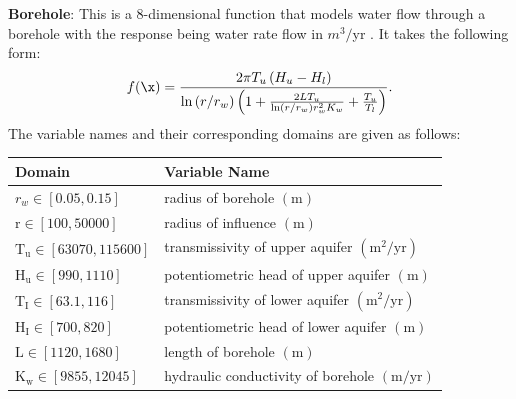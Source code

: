 \documentclass [PhD] {package/uclathes}
\begin{document}
\textbf{Borehole}: This is a 8-dimensional function that models water flow through a borehole with the response being water rate flow in $m^3/$yr  \parencite{simulationlib}. It takes the following form:
\begin{equation*}
f(\x)=\frac{2 \pi T_u\left(H_u-H_l\right)}{\ln \left(r / r_w\right)\left(1+\frac{2 L T_u}{\ln \left(r / r_w\right) r_w^2 K_w}+\frac{T_u}{T_l}\right)}.
\end{equation*}
The variable names and their corresponding domains are given as follows: \\

\begin{center}
\begin{tabular}{|l|l|}
\hline
\textbf{Domain} & \textbf{Variable Name} \\
\hline$r_w \in[0.05,0.15]$ & radius of borehole $(\mathrm{m})$   \\
\hline $\mathrm{r} \in[100,50000]$ & radius of influence $(\mathrm{m})$ \\
\hline $\mathrm{T}_{\mathrm{u}} \in[63070,115600]$ & transmissivity of upper aquifer $\left(\mathrm{m}^2 / \mathrm{yr}\right)$ \\
\hline $\mathrm{H}_{\mathrm{u}} \in[990,1110]$ & potentiometric head of upper aquifer $(\mathrm{m})$ \\
\hline $\mathrm{T}_{\mathrm{I}} \in[63.1,116]$ & transmissivity of lower aquifer $\left(\mathrm{m}^2 / \mathrm{yr}\right)$  \\
\hline $\mathrm{H}_{\mathrm{I}} \in[700,820]$ & potentiometric head of lower aquifer $(\mathrm{m})$  \\
\hline $\mathrm{L} \in[1120,1680]$ & length of borehole $(\mathrm{m})$ \\
\hline $\mathrm{K}_{\mathrm{w}} \in[9855,12045]$ & hydraulic conductivity of borehole $(\mathrm{m} / \mathrm{yr})$ \\
\hline
\end{tabular}
\end{center}
\end{document}
